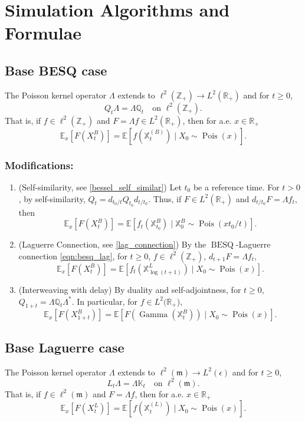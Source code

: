 \documentclass[11pt,a4,reqno]{amsart}
\numberwithin{equation}{section}
\theoremstyle{definition}
\theoremstyle{remark}
\newcommand{\bb}[1]{\mathbb{#1}}
\newcommand{\frk}[1]{\mathfrak{#1}}
\newcommand{\E}{\bb{E}}
\newcommand{\R}{\bb{R}}
\newcommand{\Z}{\bb{Z}}
\DeclareMathOperator{\besq}{BESQ}
\DeclareMathOperator{\pois}{Pois}
\DeclareMathOperator{\Gam}{Gamma}
\newcommand{\beq}{\begin{equation}}
\newcommand{\eeq}{\end{equation}}
\begin{document}
\section{Simulation Algorithms and Formulae}

\subsection{Base BESQ case} 
	The Poisson kernel operator $\Lambda$ extends to $\ell^2(\Z_+) \to L^2(\R_+)$ and for $t \geq 0$, 
	\beq Q_t\Lambda = \Lambda \bb{Q}_t \quad \text{on } \ell^2(\Z_+). \eeq
	That is, if $f \in \ell^2(\Z_+)$ and $F = \Lambda f \in L^2(\R_+)$, then for a.e. $x \in \R_+$
	\beq \E_x[F(X_t^{B})] = \E[f(\bb{X}_t^{(B)}) \mid X_0 \sim \pois(x)] . \eeq
	
\subsubsection{Modifications:}
	\begin{enumerate}
	
		\item (Self-similarity, see \ref{bessel_self_similar}) Let $t_0$ be a reference time. For $t > 0$, by self-similarity, $Q_t = d_{t_0/t} Q_{t_0} d_{t/t_0}$. Thus, if $F \in L^2(\R_+)$ and $d_{t/t_0} F = \Lambda f_t$, then
			\beq \E_x[F(X_t^B)] = \E[f_t(\bb{X}^B_{t_0}) \mid \bb{X}^B_0 \sim \pois(xt_0/t)] . \eeq
			
		\item (Laguerre Connection, see \ref{lag_connection}) By the $\besq$-Laguerre connection \eqref{eqn:besq_lag}, for $t \geq  0$, $f \in \ell^2(\Z_+)$, $d_{t + 1}F = \Lambda f_t$,
			\beq \E_x[F(X_t^{B})] = \E[f_t(\bb{X}^{L}_{\log (t + 1)}) \mid X_0 \sim \pois(x)] . \eeq
			
		\item (Interweaving with delay) By duality and self-adjointness, for $t \geq 0$,  $Q_{1 + t} = \Lambda \bb{Q}_t \Lambda^*$. In particular, for $f \in L^2(\R_+$), 
			\beq \E_x[F(X_{1 + t}^{B})] = \E[F(\Gam(\bb{X}_t^{B})) \mid X_0 \sim \pois(x)] . \eeq
	
	\end{enumerate}
	
\subsection{Base Laguerre case} 
	The Poisson kernel operator $\Lambda$ extends to $\ell^2(\frk{m}) \to L^2(\epsilon)$ and for $t \geq 0$, 
	\beq L_t\Lambda = \Lambda \bb{K}_t \quad \text{on } \ell^2(\frk{m}). \eeq
	That is, if $f \in \ell^2(\frk{m})$ and $F = \Lambda f$, then for a.e. $x \in \R_+$
	\beq \E_x[F(X_t^{L})] = \E[f(\bb{X}_t^{(L)}) \mid X_0 \sim \pois(x)] . \eeq
	
\end{document}
